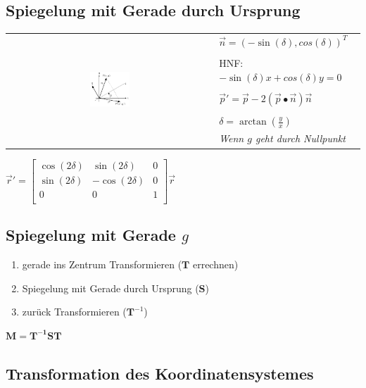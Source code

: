 \subsection{Spiegelung mit Gerade durch Ursprung}

\begin{tabular}{cl}
    \multirow{8}{*}{
        \includegraphics[width=0.2\textwidth]{assets/mirror-on-line.png}
    } & $\vec{n} = (-\sin(\delta), cos(\delta))^T$ \\
    & \\
    & HNF: $-\sin(\delta)x + cos(\delta)y = 0$\\
    & \\
    & $\vec{p}' = \vec{p} - 2 (\vec{p} \bullet \vec{n}) \vec{n}$\\
    & \\
    & $\delta = \arctan(\frac{y}{x})$ \\
    & \textit{Wenn $g$ geht durch Nullpunkt}\\
\end{tabular}

$\vec{r}' = \left[\begin{array}{cc|c}
    \cos(2\delta) & \sin(2\delta) & 0 \\
    \sin(2\delta) & -\cos(2\delta) & 0 \\
    \hline
    0 & 0 & 1 \\
\end{array}\right] \vec{r}$

\subsection{Spiegelung mit Gerade $g$}

\begin{enumerate}
    \item gerade ins Zentrum Transformieren ($\mathbf{T}$ errechnen)
    \item Spiegelung mit Gerade durch Ursprung ($\mathbf{S}$)
    \item zurück Transformieren ($\mathbf{T}^{-1}$)
\end{enumerate}

$\mathbf{M} = \mathbf{T^{-1}ST}$

\subsection{Transformation des Koordinatensystemes}

